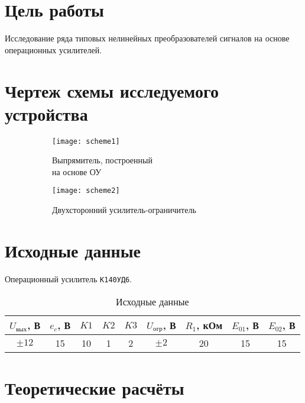 





\section{Цель работы}

Исследование ряда типовых нелинейных преобразователей сигналов на основе операционных усилителей.

\section{Чертеж схемы исследуемого устройства}

\begin{figure}[H]
\begin{center}
	\begin{subfigure}[b]{0.45\textwidth}
		\texttt{[image: scheme1]}
		\caption{Выпрямитель, построенный \\на основе ОУ}
	\end{subfigure}
	\begin{subfigure}[b]{0.45\textwidth}
		\texttt{[image: scheme2]}
		\caption{Двухсторонний усилитель-ограничитель}
	\end{subfigure}
	\caption{}
\end{center}
\end{figure}


\section{Исходные данные}

Операционный усилитель \verb+К140УД6+.

\begin{table}[H]
\begin{center}
	\caption{Исходные данные}
	\def\tabcolsep{8pt}
	\begin{tabular}{|c|c|c|c|c|c|c|c|c|}
		\hline
		$U_\text{вых}$, В &
		$e_c$, В &
		$K1$ &
		$K2$ &
		$K3$ &
		$U_\text{огр}$, В &
		$R_1$, кОм &
		$E_{01}$, В &
		$E_{02}$, В \\
		\hline
		$\pm12$ &
		15 &
		10 &
		1 &
		2 &
		$\pm2$ &
		20 &
		15 &
		15 \\
	    \hline	
	\end{tabular}
\end{center}
\end{table}

\section{Теоретические расчёты}

